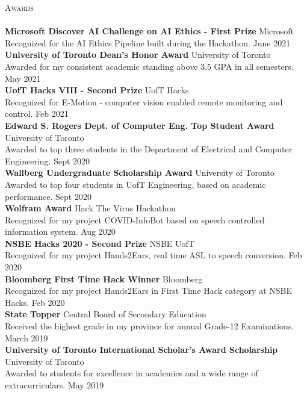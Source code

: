 \documentclass[a4paper]{article}
\newcommand{\lineunder} {
    \vspace*{-8pt} \\
    \hspace*{-18pt} \hrulefill \\
}
\newcommand{\header} [1] {
    {\hspace*{-18pt}\vspace*{6pt} \textsc{#1}}
    \vspace*{-6pt} \lineunder
}
\begin{document}
\header{Awards}
\textbf{Microsoft Discover AI Challenge on AI Ethics - First Prize} \hfill Microsoft\\
Recognized for the AI Ethics Pipeline built during the Hackathon. \hfill June 2021\\
\vspace*{2mm}
\textbf{University of Toronto Dean’s Honor Award} \hfill University of Toronto\\
Awarded for my consistent academic standing above 3.5 GPA in all semesters. \hfill May 2021\\
\vspace*{2mm}
\textbf{UofT Hacks VIII - Second Prize} \hfill UofT Hacks\\
Recognized for E-Motion - computer vision enabled remote monitoring and
control. \hfill Feb 2021\\
\vspace*{2mm}
\textbf{Edward S. Rogers Dept. of Computer Eng. Top Student Award} \hfill University of Toronto\\
Awarded to top three students in the Department of Electrical and Computer
Engineering. \hfill Sept 2020\\
\vspace*{2mm}
\textbf{Wallberg Undergraduate Scholarship Award} \hfill University of Toronto\\
Awarded to top four students in UofT Engineering, based on academic
performance. \hfill Sept 2020\\
\vspace*{2mm}
\textbf{Wolfram Award} \hfill Hack The Virus Hackathon\\
Recognized for my project COVID-InfoBot based on speech controlled information system. \hfill Aug 2020\\
\vspace*{2mm}
\textbf{NSBE Hacks 2020 - Second Prize} \hfill NSBE UofT\\
Recognized for my project Hands2Ears, real time ASL to speech conversion. \hfill Feb 2020\\
\vspace*{2mm}
\textbf{Bloomberg First Time Hack Winner} \hfill Bloomberg\\
Recognized for my project Hands2Ears in \textquotedbl{}First Time Hack\textquotedbl{} category at NSBE Hacks. \hfill Feb 2020\\
\vspace*{2mm}
\textbf{State Topper} \hfill Central Board of Secondary Education\\
Received the highest grade in my province for annual Grade-12 Examinations. \hfill March 2019\\
\vspace*{2mm}
\textbf{University of Toronto International Scholar’s Award Scholarship} \hfill University of Toronto\\
Awarded to students for excellence in academics and a wide range of extracurriculars. \hfill May 2019\\
\end{document}
